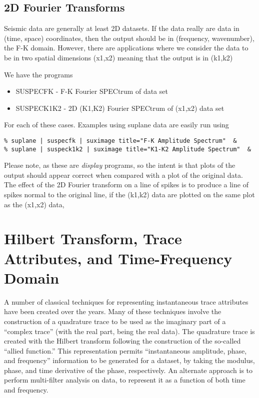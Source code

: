 {{{{{{{\subsection{2D Fourier Transforms}

Seismic data are generally at least 2D datasets. If the data
really are data in (time, space) coordinates, then the output
should be in (frequency, wavenumber), the F-K domain.
However,
there are applications where we consider the data to be
in two spatial dimensions (x1,x2) meaning that the output
is in (k1,k2)

We have the programs
\begin{itemize}
\item SUSPECFK - F-K Fourier SPECtrum of data set 
\item SUSPECK1K2 - 2D (K1,K2) Fourier SPECtrum of (x1,x2) data set
\end{itemize}
For each of these cases. Examples using suplane data are easily
run using
{\small \begin{verbatim}
% suplane | suspecfk | suximage title="F-K Amplitude Spectrum"  &
% suplane | suspeck1k2 | suximage title="K1-K2 Amplitude Spectrum"  &
\end{verbatim}}\noindent
Please note, as these are {\em display\/} programs, so the intent is that 
plots of the output should appear correct when compared with a
plot of the original data. The effect of the 2D Fourier transform 
on a line of spikes is to produce a line of spikes normal to the
original line, if the (k1,k2) data are plotted on the same plot as
the (x1,x2) data, 

\section{Hilbert Transform, Trace Attributes, and Time-Frequency Domain}

A number of classical techniques for representing instantaneous trace
attributes have been created over the years. Many of these techniques
involve the construction of a quadrature trace to be used as the
imaginary part of a ``complex trace'' (with the real part, being 
the real data). The quadrature trace is created with the Hilbert
transform following the construction of the so-called ``allied function.''
This representation permits ``instantaneous amplitude, phase,
and frequency'' information to be generated for a dataset, by
taking the modulus, phase, and time derivative of the phase, respectively.
An alternate approach is to perform multi-filter analysis on data,
to represent it as a function of both time and frequency.

}}}}}}}
